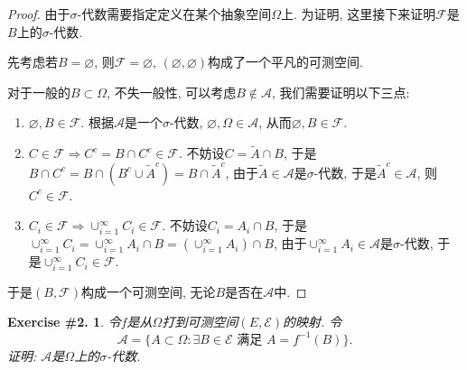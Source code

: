 \documentclass[UTF8, a4paper]{article}
\newtheorem{exercise}{Exercise \#2.}
\begin{document}
\begin{proof}
由于\(\sigma\)-代数需要指定定义在某个抽象空间\(\Omega\)上. 为证明, 这里接下来证明\(\mathcal{F}\)是\(B\)上的\(\sigma\)-代数.

先考虑若\(B = \varnothing\), 则\(\mathcal{F} = \varnothing\), \((\varnothing, \varnothing)\)构成了一个平凡的可测空间.

对于一般的\(B\subset \Omega\), 不失一般性, 可以考虑\(B \notin \mathcal{A}\), 我们需要证明以下三点:
\begin{enumerate}
    \item \(\varnothing, B \in \mathcal{F}\). 根据\(\mathcal{A}\)是一个\(\sigma\)-代数, \(\varnothing, \Omega \in \mathcal{A}\), 从而\(\varnothing, B \in \mathcal{F}\).
    \item \(C \in \mathcal{F} \Rightarrow C^c = B \cap C^c \in \mathcal{F}\). 不妨设\(C = \tilde{A} \cap B\), 于是\(B\cap C^c = B\cap(B^c \cup \tilde{A}^c) = B\cap \tilde{A}^c\), 由于\(\tilde{A} \in \mathcal{A}\)是\(\sigma\)-代数, 于是\(\tilde{A}^c \in \mathcal{A}\), 则\(C^c \in \mathcal{F}\).
    \item \(C_i \in \mathcal{F} \Rightarrow \cup_{i = 1}^\infty C_i \in \mathcal{F}\). 不妨设\(C_i = A_i \cap B\), 于是\(\cup_{i = 1}^\infty C_i = \cup_{i = 1}^\infty A_i \cap B = (\cup_{i = 1}^\infty A_i) \cap B\), 由于\(\cup_{i = 1}^\infty A_i \in \mathcal{A}\)是\(\sigma\)-代数, 于是\(\cup_{i = 1}^\infty C_i \in \mathcal{F}\).
\end{enumerate}
于是\((B, \mathcal{F})\)构成一个可测空间, 无论\(B\)是否在\(\mathcal{A}\)中.
\end{proof}



\begin{framed}
\begin{exercise}
令\(f\)是从\(\Omega\)打到可测空间\((E, \mathcal{E})\)的映射. 令$$\mathcal{A} = \{A\subset \Omega: \exists B \in \mathcal{E} \text{ 满足 } A = f^{-1}(B)\}.$$ 证明: \(\mathcal{A}\)是\(\Omega\)上的\(\sigma\)-代数.
\end{exercise}
\end{framed}
\end{document}

